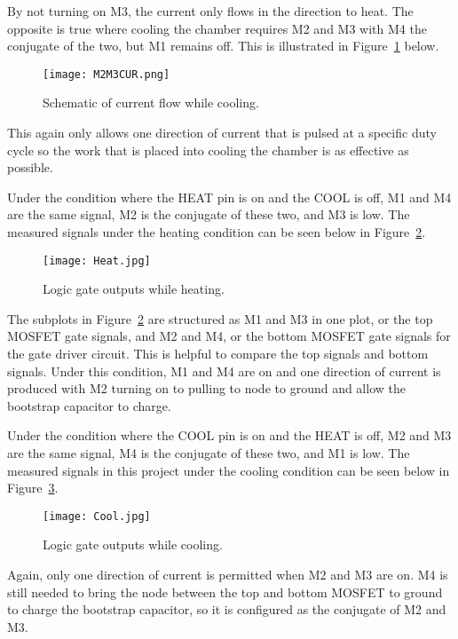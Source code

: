 \documentclass[11pt,letter]{article}
\begin{document}
By not turning on M3, the current only flows in the direction to heat. The opposite is true where cooling the chamber requires M2 and M3 with M4 the conjugate of the two, but M1 remains off. This is illustrated in Figure~\ref{fig:COOLCUR} below.

\begin{figure}[H]
    \centering
    \texttt{[image: M2M3CUR.png]}
    \caption{Schematic of current flow while cooling.}
    \label{fig:COOLCUR}
\end{figure}

This again only allows one direction of current that is pulsed at a specific duty cycle so the work that is placed into cooling the chamber is as effective as possible. 

Under the condition where the HEAT pin is on and the COOL is off, M1 and M4 are the same signal, M2 is the conjugate of these two, and M3 is low. The measured signals under the heating condition can be seen below in Figure~\ref{fig:heatLogic}.

\begin{figure}[H]
    \centering
    \texttt{[image: Heat.jpg]}
    \caption{Logic gate outputs while heating.}
    \label{fig:heatLogic}
\end{figure}

The subplots in Figure~\ref{fig:heatLogic} are structured as M1 and M3 in one plot, or the top MOSFET gate signals, and M2 and M4, or the bottom MOSFET gate signals for the gate driver circuit. This is helpful to compare the top signals and bottom signals. Under this condition, M1 and M4 are on and one direction of current is produced with M2 turning on to pulling to node to ground and allow the bootstrap capacitor to charge.

Under the condition where the COOL pin is on and the HEAT is off, M2 and M3 are the same signal, M4 is the conjugate of these two, and M1 is low. The measured signals in this project under the cooling condition can be seen below in Figure~\ref{fig:coolLogic}.

\begin{figure}[H]
    \centering
    \texttt{[image: Cool.jpg]}
    \caption{Logic gate outputs while cooling.}
    \label{fig:coolLogic}
\end{figure}

Again, only one direction of current is permitted when M2 and M3 are on. M4 is still needed to bring the node between the top and bottom MOSFET to ground to charge the bootstrap capacitor, so it is configured as the conjugate of M2 and M3.
\end{document}
